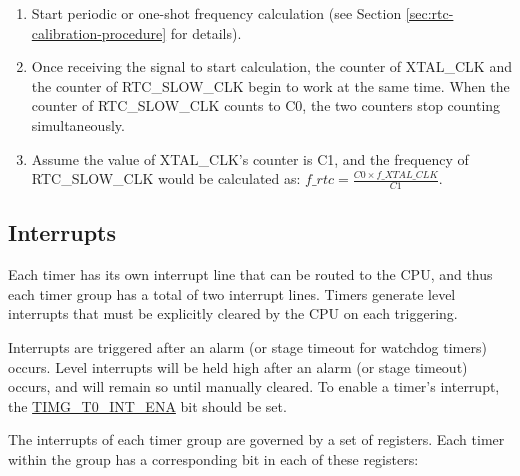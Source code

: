 \documentclass[main\_\_EN.tex]{subfiles}
\begin{document}
\begin{enumerate}
    \item Start periodic or one-shot frequency calculation (see Section \ref{sec:rtc-calibration-procedure} for details).
    \item Once receiving the signal to start calculation, the counter of XTAL\_CLK and the counter of RTC\_SLOW\_CLK begin to work at the same time. When the counter of RTC\_SLOW\_CLK counts to C0, the two counters stop counting simultaneously.
    \item Assume the value of XTAL\_CLK's counter is C1, and the frequency of RTC\_SLOW\_CLK would be calculated as:
    $f\_rtc = \frac{C0 \times f\_XTAL\_CLK}{C1}$.
\end{enumerate}
   
\subsection{Interrupts}\label{sec:timg-interrupt}

Each timer has its own interrupt line that can be routed to the CPU, and thus each timer group has a total of two interrupt lines. Timers generate level interrupts that must be explicitly cleared by the CPU on each triggering.

Interrupts are triggered after an alarm (or stage timeout for watchdog timers) occurs. Level interrupts will be held high after an alarm (or stage timeout) occurs, and will remain so until manually cleared. To enable a timer's interrupt, the \hyperref[fielddesc:TIMGT0INTENA]{TIMG\_T0\_INT\_ENA} bit should be set.

The interrupts of each timer group are governed by a set of registers. Each timer within the group has a corresponding bit in each of these registers:
\end{document}
